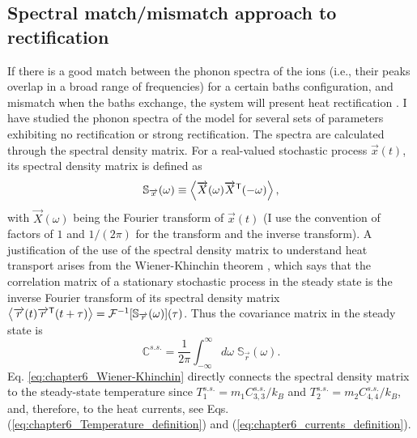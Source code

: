 \subsection{Spectral match/mismatch approach to rectification}



If there is a good match between the phonon spectra of the ions (i.e., their peaks overlap in a broad range of frequencies) for a certain baths configuration, and mismatch when the baths exchange, the system will present heat rectification \cite{Terraneo2002,Li2004}.
I have studied the phonon spectra of the model for several sets of parameters exhibiting no rectification or strong rectification. The spectra are calculated  through the spectral density matrix. For a real-valued stochastic process $\overrightarrow{x}(t)$, its spectral density matrix is defined as \cite{Sarkka2019}
%
\begin{equation}
  \mathbb{S}_{\overrightarrow{x}}(\omega) \equiv \expval{ \overrightarrow{X}(\omega) \overrightarrow{X}^\mathsf{T}(-\omega) },
  \label{eq:chapter6_SpectralDensityDefinition}
\end{equation}
%
with $\overrightarrow{X}(\omega)$ being the Fourier transform of $\overrightarrow{x}(t)$ (I use the convention of factors of $1$ and ${1}/{(2\pi)}$ for the transform and the inverse transform). A justification of the use of the spectral density matrix to understand heat transport arises from the Wiener-Khinchin theorem \cite{Sarkka2019}, which says that the correlation matrix of a stationary stochastic process in the steady state is the inverse Fourier transform of its spectral density matrix $\expval{\overrightarrow{r}(t)\overrightarrow{r}^\mathsf{T}(t+\tau)} = \mathcal{F}^{-1}[\mathbb{S}_{\overrightarrow{r}}(\omega)](\tau)$. Thus  the covariance matrix in the steady state is
%
\begin{equation}
  \mathbb{C}^{s.s.} = \frac{1}{2\pi} \int_{-\infty}^{\infty}d\omega\;\mathbb{S}_{\overrightarrow{r}}(\omega).
  \label{eq:chapter6_Wiener-Khinchin}
\end{equation}
%
Eq. \eqref{eq:chapter6_Wiener-Khinchin} directly connects the spectral density matrix to the steady-state temperature
since  $T_1^{s.s.} = {m_1 C_{3,3}^{s.s.}}/{k_B}$ and $T_2^{s.s.} = {m_2 C_{4,4}^{s.s.}}/{k_B}$, and, therefore, to the heat currents,
see  Eqs.(\ref{eq:chapter6_Temperature_definition}) and (\ref{eq:chapter6_currents_definition}).


